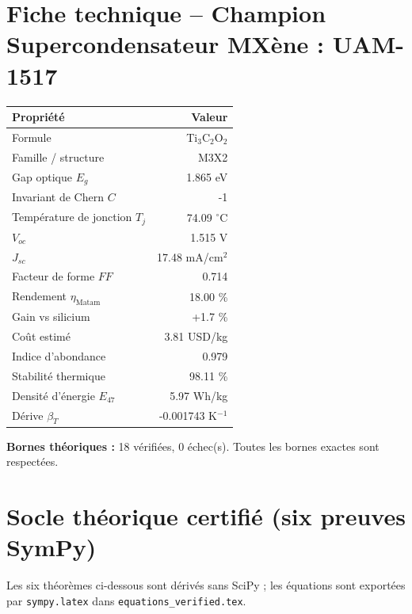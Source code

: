 \documentclass[11pt,a4paper,french]{article}
\begin{document}
\section{Fiche technique -- Champion Supercondensateur MXène : UAM-1517}
\begin{tcolorbox}[colback=green!5,colframe=green!50!black,title=Matériau Ti$_{3}$C$_{2}$O$_{2}$ --- stockage électrochimique]
\begin{tabular}{lr}
\toprule
Propriété & Valeur \\
\midrule
Formule & Ti$_{3}$C$_{2}$O$_{2}$ \\
Famille / structure & M3X2 \\
Gap optique $E_g$ & 1.865 eV \\
Invariant de Chern $C$ & -1 \\
Température de jonction $T_j$ & 74.09 $^\circ$C \\
$V_{oc}$ & 1.515 V \\
$J_{sc}$ & 17.48 mA/cm$^2$ \\
Facteur de forme $FF$ & 0.714 \\
Rendement $\eta_{\mathrm{{Matam}}}$ & 18.00 \% \\
Gain vs silicium & +1.7 \% \\
Coût estimé & 3.81 USD/kg \\
Indice d'abondance & 0.979 \\
Stabilité thermique & 98.11 \% \\
Densité d'énergie $E_{{47}}$ & 5.97 Wh/kg \\
Dérive $\beta_T$ & -0.001743 K$^{-1}$ \\
\bottomrule
\end{tabular}

\noindent\textbf{Bornes théoriques :} 18 vérifiées, 0 échec(s). Toutes les bornes exactes sont respectées.
\end{tcolorbox}

\section{Socle théorique certifié (six preuves SymPy)}
Les six théorèmes ci-dessous sont dérivés sans SciPy ; les équations sont exportées par \texttt{sympy.latex} dans \texttt{equations\_verified.tex}.
\end{document}
